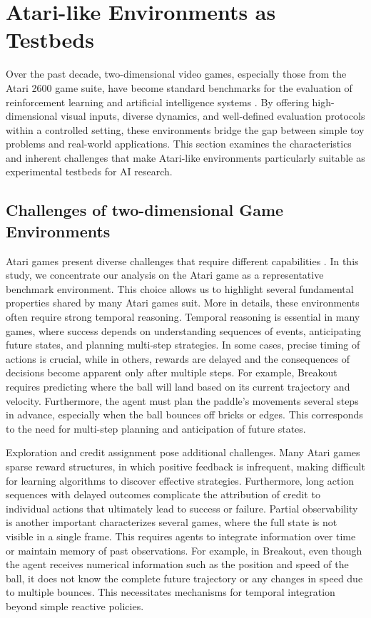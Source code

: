 \documentclass[12pt,a4paper]{report}
\begin{document}
\section{Atari-like Environments as Testbeds}
Over the past decade, two-dimensional video games, especially those from the Atari 2600 game suite, have become standard benchmarks for the evaluation of reinforcement learning and artificial intelligence systems \cite{chiave61}. By offering high-dimensional visual inputs, diverse dynamics, and well-defined evaluation protocols within a controlled setting, these environments bridge the gap between simple toy problems and real-world applications. This section examines the characteristics and inherent challenges that make Atari-like environments particularly suitable as experimental testbeds for AI research.
\subsection{Challenges of two-dimensional Game Environments}
Atari games present diverse challenges that require different capabilities \cite{chiave62}. In this study, we concentrate our analysis on the Atari game as a representative benchmark environment. This choice allows us to highlight several fundamental properties shared by many Atari games suit. 
More in details, these environments often require strong temporal reasoning. Temporal reasoning is essential in many games, where success depends on understanding sequences of events, anticipating future states, and planning multi-step strategies. In some cases, precise timing of actions is crucial, while in others, rewards are delayed and the consequences of decisions become apparent only after multiple steps. For example, Breakout requires predicting where the ball will land based on its current trajectory and velocity. Furthermore, the agent must plan the paddle's movements several steps in advance, especially when the ball bounces off bricks or edges. This corresponds to the need for multi-step planning and anticipation of future states.

Exploration and credit assignment pose additional challenges. Many Atari games sparse reward structures, in which positive feedback is infrequent, making difficult for learning algorithms to discover effective strategies. Furthermore, long action sequences with delayed outcomes complicate the attribution of credit to individual actions that ultimately lead to success or failure. 
Partial observability is another important characterizes several games, where the full state is not visible in a single frame. This requires agents to integrate information over time or maintain memory of past observations. For example, in Breakout, even though the agent receives numerical information such as the position and speed of the ball, it does not know the complete future trajectory or any changes in speed due to multiple bounces.  This necessitates mechanisms for temporal integration beyond simple reactive policies.
\end{document}
